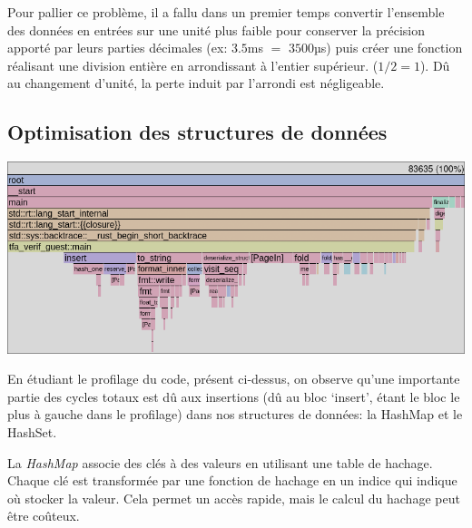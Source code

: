 \documentclass[12pt]{report}
\begin{document}
\medskip

Pour pallier ce problème, il a fallu dans un premier temps convertir
l'ensemble des données en entrées sur une unité plus faible pour 
conserver la précision apporté par leurs parties décimales (ex: 
$3.5$ms $=$ $3500$µs) puis créer une fonction réalisant une
division entière en arrondissant à l'entier supérieur. ($1/2 = 1$).
Dû au changement d'unité, la perte induit par l'arrondi est négligeable.

\subsection{Optimisation des structures de données}

\begin{center}
  \includegraphics[width=1\textwidth]{flamegraph_1.png}
\end{center}

En étudiant le profilage du code, présent ci-dessus, on observe
qu'une importante partie des cycles totaux est dû aux insertions
(dû au bloc `insert', étant le bloc le plus à gauche dans le profilage) 
dans nos structures de données: la HashMap et le HashSet.

\medskip

La \textit{HashMap} associe des clés à des valeurs en utilisant 
une table de hachage. Chaque clé est transformée par une fonction 
de hachage en un indice qui indique où stocker la valeur. Cela 
permet un accès rapide, mais le calcul du hachage peut être coûteux.

\vspace{0.3cm}
\begin{center}
\end{center}
\end{document}
